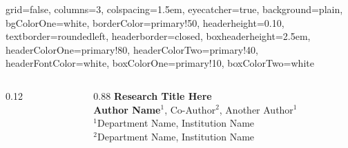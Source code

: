 \documentclass[a0paper,portrait,fontscale=0.285]{baposter}
\begin{document}
\begin{poster}{

  grid=false,
  columns=3,
  colspacing=1.5em,
  eyecatcher=true,
  background=plain,
  bgColorOne=white,
  borderColor=primary!50,
  headerheight=0.10\textheight,
  textborder=roundedleft,
  headerborder=closed,
  boxheaderheight=2.5em,
  headerColorOne=primary!80,
  headerColorTwo=primary!40,
  headerFontColor=white,
  boxColorOne=primary!10,
  boxColorTwo=white

}{

  \begin{columns}
    \begin{column}{0.12\linewidth}
    \end{column}
    \begin{column}{0.88\linewidth}
      \vspace{1.5em}
      \color{primary!80!black}
      \Huge{\textbf{Research Title Here}}\\[1em]
      \Large{\textbf{Author Name}$^1$, Co-Author$^2$, Another Author$^1$}\\[0.5em]
      \normalsize{$^1$Department Name, Institution Name}\\
      \normalsize{$^2$Department Name, Institution Name}
    \end{column}
  \end{columns}

  }
\end{poster}
\end{document}
